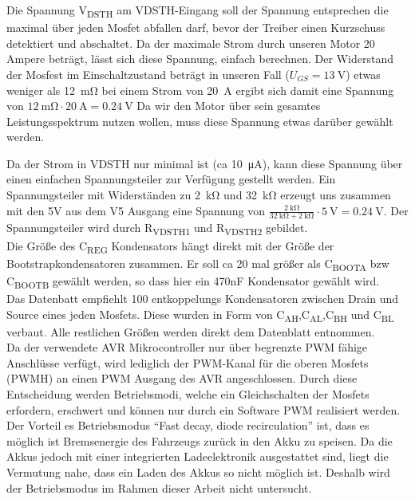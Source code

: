 Die Spannung V\textsubscript{DSTH} am VDSTH-Eingang soll der Spannung entsprechen die maximal über jeden Mosfet abfallen darf, bevor der Treiber einen Kurzschuss detektiert 
und abschaltet. Da der maximale Strom durch unseren Motor 20 Ampere beträgt, lässt sich diese Spannung, einfach berechnen. Der Widerstand der Mosfest im Einschaltzustand beträgt
in unseren Fall ($U_{GS}=\SI{13}{\V}$) etwas weniger als \SI{12}{\mohm}  bei einem Strom von \SI{20}{\A} ergibt sich damit eine Spannung von $\SI{12}{\mohm} \cdot \SI{20}{\A} = \SI{0,24}{\V}$
Da wir den Motor über sein gesamtes Leistungsspektrum nutzen wollen, muss diese Spannung etwas darüber gewählt werden.

Da der Strom in VDSTH nur minimal ist (ca \SI{10}{\uA}), kann diese Spannung über einen einfachen Spannungsteiler zur Verfügung gestellt werden. Ein Spannungsteiler mit 
Widerständen zu \SI{2}{\kohm} und \SI{32}{\kohm} erzeugt uns zusammen mit den 5V aus dem V5 Ausgang eine Spannung von $\frac{\SI{2}{\kohm}}{\SI{32}{\kohm}+\SI{2}{\kohm}}\cdot \SI{5}{\V} =\SI{0,24}{\V}$.
Der Spannungsteiler wird durch R\textsubscript{VDSTH1} und R\textsubscript{VDSTH2} gebildet.\\

Die Größe des C\textsubscript{REG} Kondensators hängt direkt mit der Größe der Bootstrapkondensatoren zusammen. Er soll ca 20 mal größer als
C\textsubscript{BOOTA} bzw C\textsubscript{BOOTB} gewählt werden, so dass hier ein 470nF Kondensator gewählt wird.\\

Das Datenbatt empfiehlt \SI{100}{\nF} entkoppelungs Kondensatoren zwischen Drain und Source eines jeden Mosfets. Diese wurden in Form von C\textsubscript{AH},C\textsubscript{AL},C\textsubscript{BH} und C\textsubscript{BL} 
verbaut. Alle restlichen Größen werden direkt dem Datenblatt entnommen.\\

Da der verwendete AVR Mikrocontroller nur über begrenzte PWM fähige Anschlüsse verfügt, wird lediglich der PWM-Kanal für die oberen Mosfets (PWMH) an einen PWM Ausgang des AVR angeschlossen.
Durch diese Entscheidung werden Betriebsmodi, welche ein Gleichschalten der Mosfets erfordern, erschwert und können nur durch ein Software PWM realisiert werden. Der Vorteil es Betriebsmodus ``Fast decay, diode recirculation''
ist, dass es möglich ist Bremsenergie des Fahrzeugs zurück in den Akku zu speisen. Da die Akkus jedoch mit einer integrierten Ladeelektronik ausgestattet sind, liegt die Vermutung nahe, dass ein Laden des Akkus so nicht möglich ist.
Deshalb wird der Betriebsmodus im Rahmen dieser Arbeit nicht untersucht.

